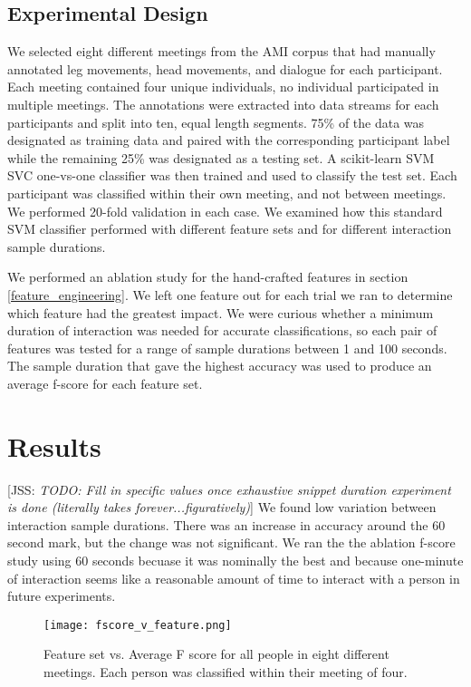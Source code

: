 \documentclass[conference]{IEEEtran}
\newcommand{\meta}[1]{{\textcolor[rgb]{0.1,0.7,0.2}{[JSS: {\it #1}]}}}
\begin{document}
\subsection{Experimental Design}

We selected eight different meetings from the AMI corpus that had manually annotated leg movements, head movements, and dialogue for each participant. Each meeting contained four unique individuals, no individual participated in multiple meetings. The annotations were extracted into data streams for each participants and split into ten, equal length segments. 75\% of the data was designated as training data and paired with the corresponding participant label while the remaining 25\% was designated as a testing set. A scikit-learn SVM SVC one-vs-one classifier was then trained and used to classify the test set. Each participant was classified within their own meeting, and not between meetings. We performed 20-fold validation in each case. We examined how this standard SVM classifier performed with different feature sets and for different interaction sample durations. 

We performed an ablation study for the hand-crafted features in section \ref{feature_engineering}. We left one feature out for each trial we ran to determine which feature had the greatest impact. We were curious whether a minimum duration of interaction was needed for accurate classifications, so each pair of features was tested for a range of sample durations between 1 and 100 seconds. The sample duration that gave the highest accuracy was used to produce an average f-score for each feature set. 

\section{Results}

\meta{TODO: Fill in specific values once exhaustive snippet duration experiment is done (literally takes forever...figuratively)} We found low variation between interaction sample durations. There was an increase in accuracy around the 60 second mark, but the change was not significant. We ran the the ablation f-score study using 60 seconds becuase it was nominally the best and because one-minute of interaction seems like a reasonable amount of time to interact with a person in future experiments. 

\begin{figure}[h!]
    \caption{Feature set vs. Average F score for all people in eight different meetings. Each person was classified within their meeting of four.}
    \centering
    \texttt{[image: fscore\_v\_feature.png]}
    \label{fscore}
\end{figure}
\end{document}
